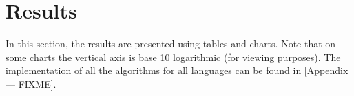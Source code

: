 \section{Results}
In this section, the results are presented using tables and charts. Note that on some charts the vertical axis is base 10 logarithmic (for viewing purposes). The implementation of all the algorithms for all languages can be found in [Appendix --- FIXME].










